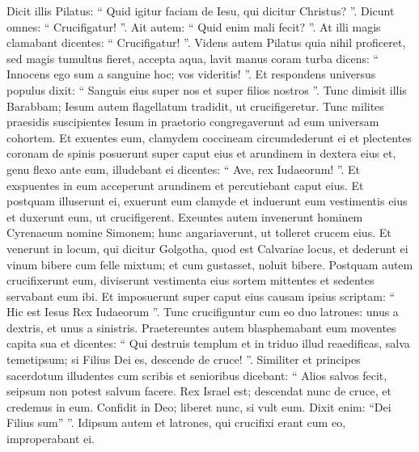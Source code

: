 \begin{biblechapter}
\begin{biblechapter}
\begin{biblechapter}
\begin{biblechapter}
\begin{biblechapter}
\begin{biblechapter}
\begin{biblechapter}
\begin{biblechapter}
\begin{biblechapter}
\begin{biblechapter}
\begin{biblechapter}
\begin{biblechapter}
\begin{biblechapter}
\begin{biblechapter}
\begin{biblechapter}
\begin{biblechapter}
\begin{biblechapter}
\begin{biblechapter}
\begin{biblechapter}
\begin{biblechapter}
\begin{biblechapter}
\begin{biblechapter}
\begin{biblechapter}
\begin{biblechapter}
\begin{biblechapter}
\begin{biblechapter}
\begin{biblechapter}
\verse Dicit illis Pilatus: “ Quid igitur faciam de Iesu, qui dicitur Christus? ”. Dicunt omnes: “ Crucifigatur! ”. 
\verse Ait autem: “ Quid enim mali fecit? ”. At illi magis clamabant dicentes: “ Crucifigatur! ”.
 \verse Videns autem Pilatus quia nihil proficeret, sed magis tumultus fieret, accepta aqua, lavit manus coram turba dicens: “ Innocens ego sum a sanguine hoc; vos videritis! ”. 
\verse Et respondens universus populus dixit: “ Sanguis eius super nos et super filios nostros ”. 
\verse Tunc dimisit illis Barabbam; Iesum autem flagellatum tradidit, ut crucifigeretur.
 \verse Tunc milites praesidis suscipientes Iesum in praetorio congregaverunt ad eum universam cohortem. 
\verse Et exuentes eum, clamydem coccineam circumdederunt ei 
 \verse et plectentes coronam de spinis posuerunt super caput eius et arundinem in dextera eius et, genu flexo ante eum, illudebant ei dicentes: “ Ave, rex Iudaeorum! ”. 
\verse Et exspuentes in eum acceperunt arundinem et percutiebant caput eius. 
\verse Et postquam illuserunt ei, exuerunt eum clamyde et induerunt eum vestimentis eius et duxerunt eum, ut crucifigerent.
 \verse Exeuntes autem invenerunt hominem Cyrenaeum nomine Simonem; hunc angariaverunt, ut tolleret crucem eius. 
\verse Et venerunt in locum, qui dicitur Golgotha, quod est Calvariae locus, 
\verse et dederunt ei vinum bibere cum felle mixtum; et cum gustasset, noluit bibere. 
\verse Postquam autem crucifixerunt eum, diviserunt vestimenta eius sortem mittentes 
\verse et sedentes servabant eum ibi. 
\verse Et imposuerunt super caput eius causam ipsius scriptam: “ Hic est Iesus Rex Iudaeorum ”.
 \verse Tunc crucifiguntur cum eo duo latrones: unus a dextris, et unus a sinistris. 
\verse Praetereuntes autem blasphemabant eum moventes capita sua 
\verse et dicentes: “ Qui destruis templum et in triduo illud reaedificas, salva temetipsum; si Filius Dei es, descende de cruce! ”. 
\verse Similiter et principes sacerdotum illudentes cum scribis et senioribus dicebant: 
\verse “ Alios salvos fecit, seipsum non potest salvum facere. Rex Israel est; descendat nunc de cruce, et credemus in eum. 
\verse Confidit in Deo; liberet nunc, si vult eum. Dixit enim: “Dei Filius sum” ”. 
\verse Idipsum autem et latrones, qui crucifixi erant cum eo, improperabant ei.

\end{biblechapter}
\end{biblechapter}
\end{biblechapter}
\end{biblechapter}
\end{biblechapter}
\end{biblechapter}
\end{biblechapter}
\end{biblechapter}
\end{biblechapter}
\end{biblechapter}
\end{biblechapter}
\end{biblechapter}
\end{biblechapter}
\end{biblechapter}
\end{biblechapter}
\end{biblechapter}
\end{biblechapter}
\end{biblechapter}
\end{biblechapter}
\end{biblechapter}
\end{biblechapter}
\end{biblechapter}
\end{biblechapter}
\end{biblechapter}
\end{biblechapter}
\end{biblechapter}
\end{biblechapter}
